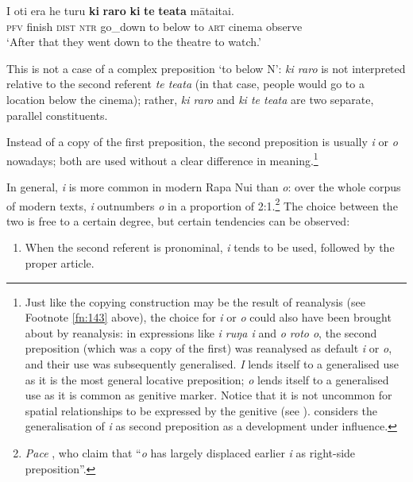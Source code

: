 \ea\label{ex:3.139}
\gll I oti era he turu \textbf{ki} \textbf{raro} \textbf{ki} \textbf{te} \textbf{teata} māta{\ꞌ}ita{\ꞌ}i.\\
\textsc{pfv} finish \textsc{dist} \textsc{ntr} go\_down to below to \textsc{art} cinema observe\\

\glt
‘After that they went down to the theatre to watch.’ \textstyleExampleref{[R210.145]} 
\z

This is not a case of a complex preposition ‘to below N’: \textit{ki raro} is not interpreted relative to the second referent \textit{te teata} (in that case, people would go to a location below the cinema); rather, \textit{ki raro} and \textit{ki te teata} are two separate, parallel constituents.

Instead of a copy of the first preposition, the second preposition is usually \textit{i} or \textit{o} nowadays; both are used without a clear difference in meaning.\footnote{\label{fn:145}Just like the copying construction may be the result of reanalysis (see Footnote \ref{fn:143} above), the choice for \textit{i} or \textit{o} could also have been brought about by reanalysis: in expressions like \textit{{\ꞌ}i ruŋa i} and \textit{o roto o}, the second preposition (which was a copy of the first) was reanalysed as default \textit{i} or \textit{o}, and their use was subsequently generalised. \textit{I} lends itself to a generalised use as it is the most general locative preposition; \textit{o} lends itself to a generalised use as it is common as genitive marker. Notice that it is not uncommon for spatial relationships to be expressed by the genitive (see \citealt[285]{Dixon2010-2}). \citet[324]{Fischer2001Hispan} considers the generalisation of \textit{i} as second preposition as a development under  influence.}

In general, \textit{i} is more common in modern Rapa Nui than \textit{o}: over the whole corpus of modern texts, \textit{i} outnumbers \textit{o} in a proportion of 2:1.\footnote{\label{fn:146}\textit{Pace} \citet[28]{FinneyAlexander1998}, who claim that “\textit{o} has largely displaced earlier \textit{i} as right-side preposition”.} The choice between the two is free to a certain degree, but certain tendencies can be observed:

\begin{enumerate}
\item 
When the second referent is pronominal, \textit{i} tends to be used, followed by the proper article.
\end{enumerate}

